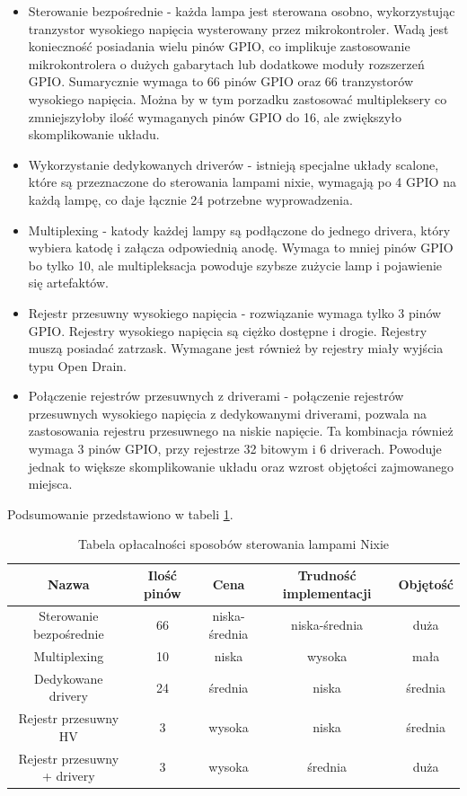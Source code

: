 \documentclass[../main.tex]{subfiles}
\begin{document}
\begin{itemize}
    \item Sterowanie bezpośrednie - każda lampa jest sterowana osobno, wykorzystując tranzystor wysokiego napięcia wysterowany przez mikrokontroler.
    Wadą jest konieczność posiadania wielu pinów GPIO, co implikuje zastosowanie mikrokontrolera o dużych gabarytach lub dodatkowe moduły rozszerzeń GPIO. Sumarycznie wymaga to 66 pinów GPIO oraz 66 tranzystorów wysokiego napięcia.
    Można by w tym porzadku zastosować multipleksery co zmniejszyłoby ilość wymaganych pinów GPIO do 16, ale zwiększyło skomplikowanie układu.
    \item Wykorzystanie dedykowanych driverów - istnieją specjalne układy scalone, które są przeznaczone do sterowania lampami nixie,
    wymagają po 4 GPIO na każdą lampę, co daje łącznie 24 potrzebne wyprowadzenia.
    \item Multiplexing - katody każdej lampy są podłączone do jednego drivera, który wybiera katodę i załącza odpowiednią anodę. 
    Wymaga to mniej pinów GPIO bo tylko 10, ale multipleksacja powoduje szybsze zużycie lamp i pojawienie się artefaktów.
    \item Rejestr przesuwny wysokiego napięcia - rozwiązanie wymaga tylko 3 pinów GPIO. Rejestry wysokiego napięcia są ciężko dostępne i drogie.
    Rejestry muszą posiadać zatrzask. Wymagane jest również by rejestry miały wyjścia typu Open Drain.
    \item Połączenie rejestrów przesuwnych z driverami - połączenie rejestrów przesuwnych wysokiego napięcia z dedykowanymi driverami, pozwala na zastosowania
    rejestru przesuwnego na niskie napięcie. Ta kombinacja również wymaga 3 pinów GPIO, przy rejestrze 32 bitowym i 6 driverach. Powoduje jednak to
    większe skomplikowanie układu oraz wzrost objętości zajmowanego miejsca.
\end{itemize}
Podsumowanie przedstawiono w tabeli \ref{tab:tabela_oplacalnosci}.
\begin{table}[H]
  \centering
  \begin{tabular}{|c|c|c|c|c|}
    \hline
    Nazwa & Ilość pinów & Cena & Trudność implementacji & Objętość\\
    \hline
    Sterowanie bezpośrednie & 66 & niska-średnia & niska-średnia & duża \\
    \hline
    Multiplexing & 10 &niska & wysoka & mała \\
    \hline
    Dedykowane drivery & 24 &średnia & niska & średnia \\
    \hline
    Rejestr przesuwny HV & 3 &wysoka & niska & średnia \\
    \hline
    Rejestr przesuwny + drivery & 3 & wysoka & średnia & duża \\
    \hline
  \end{tabular}
  \caption{Tabela opłacalności sposobów sterowania lampami Nixie}
  \label{tab:tabela_oplacalnosci}
\end{table}
\end{document}
